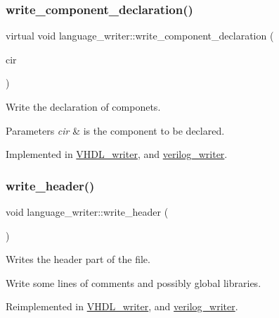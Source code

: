 \subsubsection{\texorpdfstring{write\+\_\+component\+\_\+declaration()}{write\_component\_declaration()}}
{\footnotesize\ttfamily virtual void language\+\_\+writer\+::write\+\_\+component\+\_\+declaration (\begin{DoxyParamCaption}\item[{const \hyperlink{structural__objects_8hpp_a8ea5f8cc50ab8f4c31e2751074ff60b2}{structural\+\_\+object\+Ref} \&}]{cir }\end{DoxyParamCaption})\hspace{0.3cm}{\ttfamily [pure virtual]}}



Write the declaration of componets. 


\begin{DoxyParams}{Parameters}
{\em cir} & is the component to be declared. \\
\hline
\end{DoxyParams}


Implemented in \hyperlink{structVHDL__writer_a34dbb60f7e32cdaab7b617f5cb5d9943}{V\+H\+D\+L\+\_\+writer}, and \hyperlink{classverilog__writer_a0e4f86c1473978b5c7284b763db4e55a}{verilog\+\_\+writer}.

\mbox{\label{classlanguage__writer_a3e96d627983817f9b84f72cc1fa8bb4f}} 
\subsubsection{\texorpdfstring{write\+\_\+header()}{write\_header()}}
{\footnotesize\ttfamily void language\+\_\+writer\+::write\+\_\+header (\begin{DoxyParamCaption}{ }\end{DoxyParamCaption})\hspace{0.3cm}{\ttfamily [virtual]}}



Writes the header part of the file. 

Write some lines of comments and possibly global libraries. 

Reimplemented in \hyperlink{structVHDL__writer_aae8bd96734b2cf29299f86ec53cfde3c}{V\+H\+D\+L\+\_\+writer}, and \hyperlink{classverilog__writer_a36a19f7e6beea0b3d1c16389397cf9ea}{verilog\+\_\+writer}.



